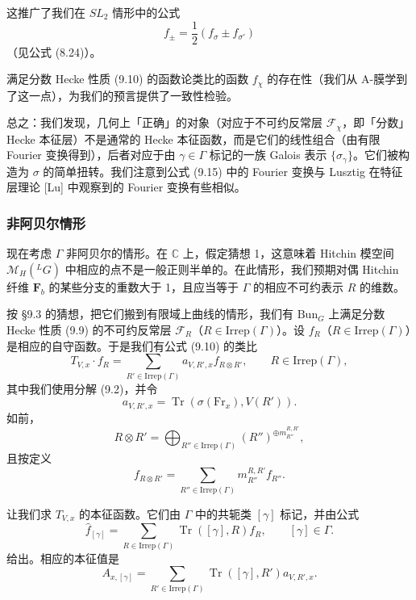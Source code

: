 \documentclass[11pt,a4paper]{article}
\newcommand{\Bun}{\mathrm{Bun}}
\newcommand{\Tr}{\operatorname{Tr}}
\begin{document}

这推广了我们在 $SL_2$ 情形中的公式
\[
f_\pm = \frac{1}{2}(f_\sigma\pm f_{\sigma'})
\]
（见公式 (8.24)）。

满足分数 Hecke 性质 (9.10) 的函数论类比的函数 $f_\chi$ 的存在性（我们从 A-膜学到了这一点），为我们的预言提供了一致性检验。

总之：我们发现，几何上「正确」的对象（对应于不可约反常层 $\mathcal{F}_\chi$，即「分数」Hecke 本征层）不是通常的 Hecke 本征函数，而是它们的线性组合（由有限 Fourier 变换得到），后者对应于由 $\gamma\in\Gamma$ 标记的一族 Galois 表示 $\{\sigma_\gamma\}$。它们被构造为 $\sigma$ 的简单扭转。我们注意到公式 (9.15) 中的 Fourier 变换与 Lusztig 在特征层理论 [Lu] 中观察到的 Fourier 变换有些相似。

\subsubsection{非阿贝尔情形}

现在考虑 $\Gamma$ 非阿贝尔的情形。在 $\mathbb{C}$ 上，假定猜想 1，这意味着 Hitchin 模空间 $\mathcal{M}_H({}^{L}G)$ 中相应的点不是一般正则半单的。在此情形，我们预期对偶 Hitchin 纤维 $\boldsymbol{F}_b$ 的某些分支的重数大于 1，且应当等于 $\Gamma$ 的相应不可约表示 $R$ 的维数。

按 §9.3 的猜想，把它们搬到有限域上曲线的情形，我们有 $\Bun_G$ 上满足分数 Hecke 性质 (9.9) 的不可约反常层 $\mathcal{F}_R$（$R\in\mathrm{Irrep}(\Gamma)$）。设 $f_R$（$R\in\mathrm{Irrep}(\Gamma)$）是相应的自守函数。于是我们有公式 (9.10) 的类比
\begin{equation}\tag{9.16}
T_{V,x}\cdot f_R = \sum_{R'\in\mathrm{Irrep}(\Gamma)}a_{V,R',x}f_{R\otimes R'},
\qquad R\in\mathrm{Irrep}(\Gamma),
\end{equation}
其中我们使用分解 (9.2)，并令
\begin{equation}\tag{9.17}
a_{V,R',x} = \Tr(\sigma(\mathrm{Fr}_x),V(R')).
\end{equation}
如前，
\[
R\otimes R' = \bigoplus_{R''\in\mathrm{Irrep}(\Gamma)}(R'')^{\oplus m^{R,R'}_{R''}},
\]
且按定义
\[
f_{R\otimes R'} = \sum_{R''\in\mathrm{Irrep}(\Gamma)}m^{R,R'}_{R''}f_{R''}.
\]

让我们求 $T_{V,x}$ 的本征函数。它们由 $\Gamma$ 中的共轭类 $[\gamma]$ 标记，并由公式
\begin{equation}\tag{9.18}
\widehat{f}_{[\gamma]} = \sum_{R\in\mathrm{Irrep}(\Gamma)}\Tr([\gamma],R)f_R,
\qquad [\gamma]\in\Gamma.
\end{equation}
给出。相应的本征值是
\begin{equation}\tag{9.19}
A_{x,[\gamma]} = \sum_{R'\in\mathrm{Irrep}(\Gamma)}\Tr([\gamma],R')a_{V,R',x}.
\end{equation}
\end{document}
